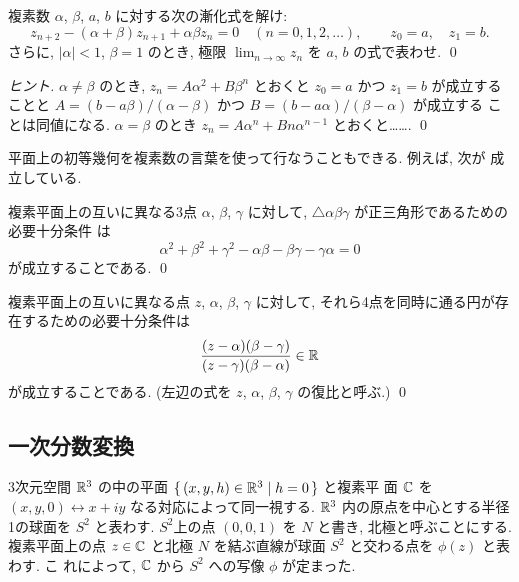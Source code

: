 \documentclass[12pt,twoside]{jarticle}
\begin{document}
\begin{question}
  複素数 $\alpha$, $\beta$, $a$, $b$ に対する次の漸化式を解け:
  \[
    z_{n+2} - (\alpha + \beta)z_{n+1} + \alpha\beta z_n = 0 
    \quad (n=0,1,2,\dots),
    \qquad z_0 = a, 
    \quad z_1 = b.
  \]%
  さらに, $|\alpha|<1$, $\beta=1$ のとき, 極限 $\lim_{n\to\infty}z_n$ 
  を $a$, $b$ の式で表わせ. \qed
\end{question}

\begin{proof}[ヒント]
 $\alpha\ne\beta$ のとき, 
 $z_n=A\alpha^2+B\beta^n$ とおくと $z_0=a$ かつ $z_1=b$ が成立することと %
 $A=(b-a\beta)/(\alpha-\beta)$ かつ $B=(b-a\alpha)/(\beta-\alpha)$ が成立する
 ことは同値になる.
 $\alpha=\beta$ のとき $z_n=A\alpha^n+Bn\alpha^{n-1}$ とおくと…….
 \qed
\end{proof}

平面上の初等幾何を複素数の言葉を使って行なうこともできる. 例えば, 次が
成立している.

\begin{question}
  複素平面上の互いに異なる3点 $\alpha$, $\beta$, $\gamma$ に対して,  
  $\bigtriangleup\alpha\beta\gamma$ が正三角形であるための必要十分条件
  は 
  \[
    \alpha^2 + \beta^2 + \gamma^2 %
    - \alpha\beta - \beta\gamma - \gamma\alpha = 0
  \]%
  が成立することである. \qed
\end{question}

\begin{question}\label{q:hukuhi-chokusen}
  複素平面上の互いに異なる点 $z$, $\alpha$, $\beta$, $\gamma$ に対して, 
  それら4点を同時に通る円が存在するための必要十分条件は
  \[
    \frac{(z - \alpha)(\beta - \gamma)}{(z - \gamma)(\beta - \alpha)}
    \in {\mathbb R}
  \]%
  が成立することである. (左辺の式を $z$, $\alpha$, $\beta$, $\gamma$ 
  の復比と呼ぶ.) \qed
\end{question}


\subsection{一次分数変換}

3次元空間 ${\mathbb R}^3$ の中の平面 $\{\,(x,y,h)\in{\mathbb R}^3\mid h=0\,\}$ と複素平
面 ${\mathbb C}$ を $(x,y,0)\leftrightarrow x+iy$ なる対応によって同一視する. 
${\mathbb R}^3$ 内の原点を中心とする半径1の球面を $S^2$ と表わす. $S^2$上の点 
$(0,0,1)$ を $N$ と書き, 北極と呼ぶことにする. 複素平面上の点 $z\in{\mathbb C}$
と北極 $N$ を結ぶ直線が球面 $S^2$ と交わる点を $\phi(z)$ と表わす.  こ
れによって, ${\mathbb C}$ から $S^2$ への写像 $\phi$ が定まった.
\end{document}
